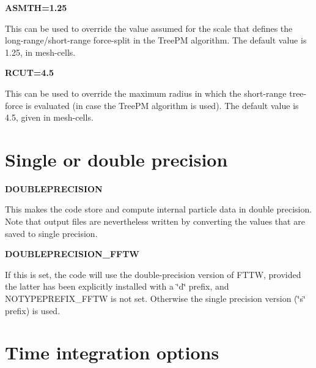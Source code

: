 \begin{DoxyItemize}
\item {\bfseries  ASMTH=1.25} \par
 This can be used to override the value assumed for the scale that defines the long-\/range/short-\/range force-\/split in the TreePM algorithm. The default value is 1.25, in mesh-\/cells.
\end{DoxyItemize}


\begin{DoxyItemize}
\item {\bfseries  RCUT=4.5} \par
 This can be used to override the maximum radius in which the short-\/range tree-\/force is evaluated (in case the TreePM algorithm is used). The default value is 4.5, given in mesh-\/cells.
\end{DoxyItemize}

\par
 \hypertarget{Gadget-Makefile_secmake4}{}\section{Single or double precision}\label{Gadget-Makefile_secmake4}

\begin{DoxyItemize}
\item {\bfseries DOUBLEPRECISION} \par
 This makes the code store and compute internal particle data in double precision. Note that output files are nevertheless written by converting the values that are saved to single precision.
\end{DoxyItemize}


\begin{DoxyItemize}
\item {\bfseries DOUBLEPRECISION\_\-FFTW} \par
 If this is set, the code will use the double-\/precision version of FTTW, provided the latter has been explicitly installed with a \char`\"{}d\char`\"{} prefix, and NOTYPEPREFIX\_\-FFTW is not set. Otherwise the single precision version (\char`\"{}s\char`\"{} prefix) is used.
\end{DoxyItemize}

\par
 \hypertarget{Gadget-Makefile_secmake5}{}\section{Time integration options}\label{Gadget-Makefile_secmake5}

